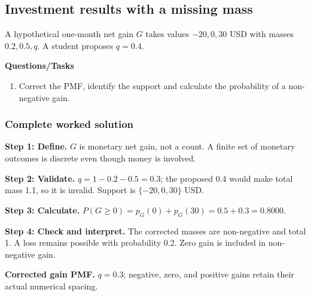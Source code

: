 \subsection{Investment results with a missing mass}
A hypothetical one-month net gain $G$ takes values $-20,0,30$ USD with masses $0.2,0.5,q$. A student proposes $q=0.4$.

\textbf{Questions/Tasks}
\begin{enumerate}
\item Correct the PMF, identify the support and calculate the probability of a non-negative gain.
\end{enumerate}
\subsubsection*{Complete worked solution}
\par\noindent\begin{minipage}{\linewidth}
\textbf{Step 1: Define.} $G$ is monetary net gain, not a count. A finite set of monetary outcomes is discrete even though money is involved.
\end{minipage}\par\medskip
\par\noindent\begin{minipage}{\linewidth}
\textbf{Step 2: Validate.} $q=1-0.2-0.5=0.3$; the proposed 0.4 would make total mass 1.1, so it is invalid. Support is $\{-20,0,30\}$ USD.
\end{minipage}\par\medskip
\par\noindent\begin{minipage}{\linewidth}
\textbf{Step 3: Calculate.} $P(G\geq0)=p_G(0)+p_G(30)=0.5+0.3=0.8000$.
\end{minipage}\par\medskip
\par\noindent\begin{minipage}{\linewidth}
\textbf{Step 4: Check and interpret.} The corrected masses are non-negative and total 1. A loss remains possible with probability 0.2. Zero gain is included in non-negative gain.
\end{minipage}\par\medskip
\par\noindent \begin{minipage}[t]{.485\linewidth}
\centering
{}
\par\small \textbf{Corrected gain PMF.} $q=0.3$; negative, zero, and positive gains retain their actual numerical spacing.
\end{minipage}\par\medskip

